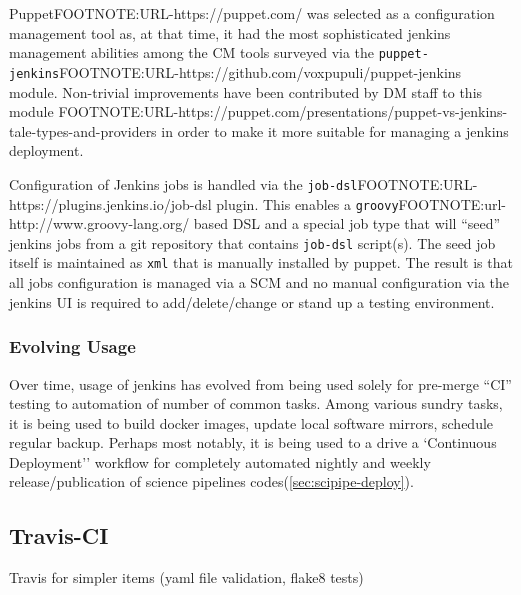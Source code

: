 PuppetFOOTNOTE:URL-https://puppet.com/ was selected as a configuration
management tool as, at that time, it had the most sophisticated jenkins
management abilities among the CM tools surveyed via the
\texttt{puppet-jenkins}FOOTNOTE:URL-https://github.com/voxpupuli/puppet-jenkins
module.  Non-trivial improvements have been contributed by DM staff to this
module
FOOTNOTE:URL-https://puppet.com/presentations/puppet-vs-jenkins-tale-types-and-providers
in order to make it more suitable for managing a jenkins deployment.

Configuration of Jenkins jobs is handled via the
\texttt{job-dsl}FOOTNOTE:URL-https://plugins.jenkins.io/job-dsl plugin.  This
enables a \texttt{groovy}FOOTNOTE:url-http://www.groovy-lang.org/ based DSL and a special job type that
will ``seed'' jenkins jobs from a git repository that contains \texttt{job-dsl}
script(s).  The seed job itself is maintained as \texttt{xml} that is manually
installed by puppet.  The result is that all jobs configuration is managed via
a SCM and no manual configuration via the jenkins UI is required to
add/delete/change or stand up a testing environment.



\subsubsection{Evolving Usage}

Over time, usage of jenkins has evolved from being used solely for pre-merge
``CI'' testing to automation of number of common tasks.  Among various sundry
tasks, it is being used to build docker images, update local software mirrors,
schedule regular backup.  Perhaps most notably, it is being used to a drive a
`Continuous Deployment'' workflow for completely automated nightly and weekly
release/publication of science pipelines codes(\ref{sec:scipipe-deploy}).

\subsection{Travis-CI}
\label{sec:travis-ci}

Travis for simpler items (yaml file validation, flake8 tests)
